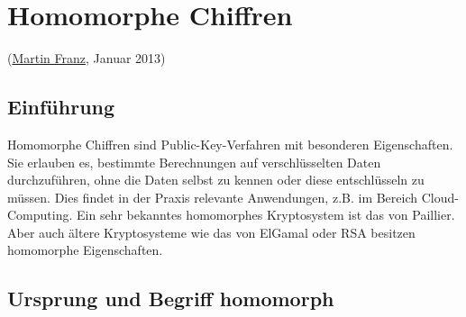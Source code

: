 
\begin{refsegment}

\newpage
\hypertarget{Chapter_HomomorphicCiphers}{}
\chapter{Homomorphe Chiffren}
\label{Chapter_HomomorphicCiphers}
(\hyperlink{author_Martin-Franz}{Martin Franz}, Januar 2013)

\section{Einführung}

Homomorphe Chiffren sind Public-Key-Verfahren mit besonderen Eigenschaften. Sie erlauben es, bestimmte Berechnungen auf verschlüsselten Daten durchzuführen, ohne die Daten selbst zu kennen oder diese entschlüsseln zu müssen. Dies findet in der Praxis relevante Anwendungen, z.B. im Bereich Cloud-Computing. Ein sehr bekanntes homomorphes Kryptosystem ist das von Paillier. Aber auch ältere Kryptosysteme wie das von ElGamal oder RSA besitzen homomorphe Eigenschaften.


\section{Ursprung und Begriff \glqq homomorph\grqq}


\end{refsegment}
